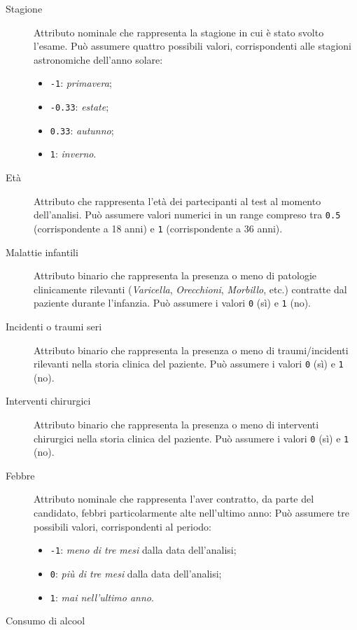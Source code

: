 \begin{description}
  \item[Stagione]
    Attributo nominale che rappresenta la stagione in cui è stato svolto l'esame.
    Può assumere quattro possibili valori, corrispondenti alle stagioni astronomiche dell'anno solare:
    \begin{itemize}
      \item \texttt{-1}: \emph{primavera};
      \item \texttt{-0.33}: \emph{estate};
      \item \texttt{0.33}: \emph{autunno};
      \item \texttt{1}: \emph{inverno}.
    \end{itemize}
  \item[Età]
    Attributo che rappresenta l'età dei partecipanti al test al momento dell'analisi.
    Può assumere valori numerici in un range compreso tra \texttt{0.5} (corrispondente a 18 anni) e \texttt{1} (corrispondente a 36 anni).
  \item[Malattie infantili]
    Attributo binario che rappresenta la presenza o meno di patologie clinicamente rilevanti (\emph{Varicella}, \emph{Orecchioni}, \emph{Morbillo}, etc.) contratte dal paziente durante l'infanzia.
    Può assumere i valori \texttt{0} (sì) e \texttt{1} (no).
  \item[Incidenti o traumi seri]
    Attributo binario che rappresenta la presenza o meno di traumi/incidenti rilevanti nella storia clinica del paziente.
    Può assumere i valori \texttt{0} (sì) e \texttt{1} (no).
  \item[Interventi chirurgici]
    Attributo binario che rappresenta la presenza o meno di interventi chirurgici nella storia clinica del paziente.
    Può assumere i valori \texttt{0} (sì) e \texttt{1} (no).
  \item[Febbre]
    Attributo nominale che rappresenta l'aver contratto, da parte del candidato, febbri particolarmente alte nell'ultimo anno:
    Può assumere tre possibili valori, corrispondenti al periodo:
    \begin{itemize}
      \item \texttt{-1}: \emph{meno di tre mesi} dalla data dell'analisi;
      \item \texttt{0}: \emph{più di tre mesi} dalla data dell'analisi;
      \item \texttt{1}: \emph{mai nell'ultimo anno}.
    \end{itemize}
  \item[Consumo di alcool]

\end{description}
